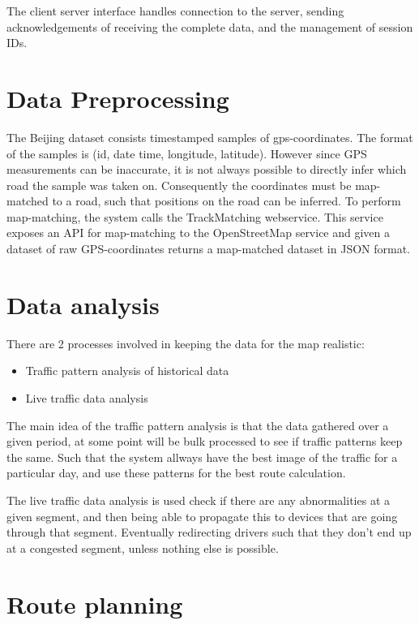The client server interface handles connection to the server,
sending acknowledgements of receiving the complete data,
and the management of session IDs. 

\section{Data Preprocessing}
The Beijing dataset consists timestamped samples of gps-coordinates. The format of the samples is (id, date time, longitude, latitude). However since GPS measurements can be inaccurate, it is not always possible to directly infer which road the sample was taken on. Consequently the coordinates must be map-matched to a road, such that positions on the road can be inferred. To perform map-matching, the system calls the TrackMatching webservice\cite{TrackMatching}. This service exposes an API for map-matching to the OpenStreetMap service and given a dataset of raw GPS-coordinates returns a map-matched dataset in JSON format. 
\section{Data analysis}
There are 2 processes involved in keeping the data for the map realistic:
\begin{itemize}
	\item Traffic pattern analysis of historical data
	\item Live traffic data analysis
\end{itemize}

The main idea of the traffic pattern analysis is that the data gathered over a given period, at some point will be bulk processed to see if traffic patterns keep the same. Such that the system allways have the best image of the traffic for a particular day, and use these patterns for the best route calculation.

The live traffic data analysis is used check if there are any abnormalities at a given segment, and then being able to propagate this to devices that are going through that segment. Eventually redirecting drivers such that they don't end up at a congested segment, unless nothing else is possible.
\section{Route planning}
